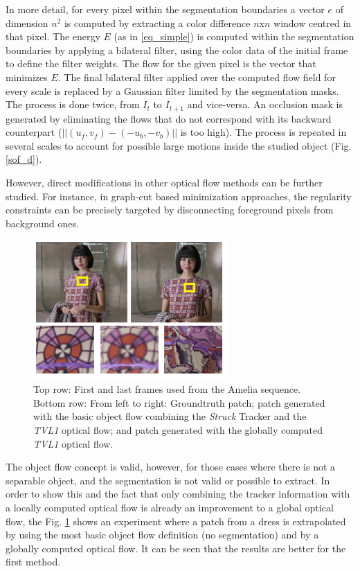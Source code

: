 In more detail, 
for every pixel within the segmentation boundaries a vector $e$ of dimension $n^2$ is computed 
by extracting a color difference $n$x$n$ window centred in that pixel. The energy $E$ (as in \ref{eq_simple}) is computed 
within the 
segmentation boundaries 
by applying a bilateral filter, 
using the color data of the initial 
frame to define the filter weights. 
The flow for the given pixel is the vector that minimizes $E$. The final bilateral filter applied over the computed flow field for every scale is replaced by a Gaussian filter limited by the segmentation masks. The process is done twice, from $I_t$ to $I_{t+1}$ and vice-versa. 
An occlusion mask is generated by eliminating the flows that do not correspond with its 
backward counterpart ($||(u_f,v_f)-(-u_b,-v_b)||$ is too high). The process is repeated in 
several scales to account for possible large motions inside the studied object (Fig. \ref{sof_d}).

However, direct modifications in other optical flow methods can be further studied. For instance, in graph-cut based 
minimization approaches, the regularity constraints can be precisely targeted by disconnecting foreground pixels from background ones.

   \begin{figure}[thpb]
      \centering
      \includegraphics[width=0.66\textwidth]{../images/objectflow_nosegm.png}
      \caption{Top row: First and last frames used from the Amelia sequence. Bottom row: From left to right: Groundtruth patch; patch generated with the 
basic object flow combining the {\it Struck} Tracker and the {\it TVL1} optical flow; and patch generated with the globally computed  {\it TVL1} optical flow.}
      \label{of_nose}
   \end{figure}

The object flow concept is valid, however, for those cases where there is not a separable object, and the segmentation is not valid or possible to extract. 
In order to show this and the fact that only combining the tracker information with a locally computed optical flow is already an improvement to a global 
optical flow, the Fig. \ref{of_nose} shows an experiment where a patch from a dress is extrapolated by using the most basic object flow definition (no segmentation) 
and by a globally computed optical flow. It can be seen that the results are better for the first method.



